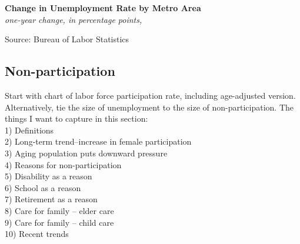 \documentclass{report}
\begin{document}
{{{{\begin{minipage}{0.76\textwidth}
\noindent \normalsize \textbf{Change in Unemployment Rate by Metro Area}\\
\footnotesize{\textit{one-year change, in percentage points, }}\\

\vspace{-2mm}

\hspace*{-15mm} 

\vspace{-2mm}

\footnotesize{Source: Bureau of Labor Statistics}

\end{minipage}


\newpage


\begin{minipage}{0.76\textwidth}

\subsection*{\color{black!70} \seriffont Non-participation}

\small Start with chart of labor force participation rate, including age-adjusted version. Alternatively, tie the size of unemployment to the size of non-participation. The things I want to capture in this section:\\

1) Definitions \\

2) Long-term trend--increase in female participation \\

3) Aging population puts downward pressure \\

4) Reasons for non-participation \\

5) Disability as a reason \\

6) School as a reason \\

7) Retirement as a reason \\

8) Care for family -- elder care \\

9) Care for family -- child care \\

10) Recent trends \\


\end{minipage}}}}}
\end{document}

